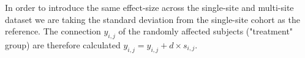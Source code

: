 \documentclass[authoryear]{elsarticle}
\begin{document}
In order to introduce the same effect-size across the single-site and multi-site dataset we are taking the standard deviation from the single-site cohort as the reference.  The connection $y_{i,j}$ of the randomly affected subjects ("treatment" group) are therefore calculated $y_{i,j} = y_{i,j} + d\times s_{i,j}$. 




 
% 
\end{document}
